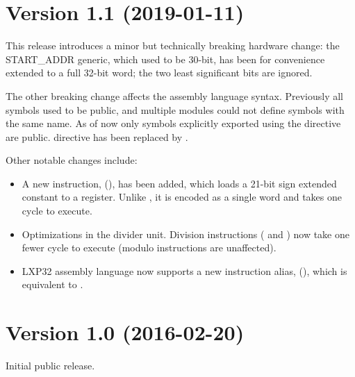\documentclass[a4paper,12pt,twoside,extrafontsizes]{memoir}
\begin{document}
\section*{Version 1.1 (2019-01-11)}

This release introduces a minor but technically breaking hardware change: the START\_ADDR generic, which used to be 30-bit, has been for convenience extended to a full 32-bit word; the two least significant bits are ignored.

The other breaking change affects the assembly language syntax. Previously all symbols used to be public, and multiple modules could not define symbols with the same name. As of now only symbols explicitly exported using the  directive are public.  directive has been replaced by .

Other notable changes include:

\begin{itemize}
	\item A new instruction,  (), has been added, which loads a 21-bit sign extended constant to a register. Unlike , it is encoded as a single word and takes one cycle to execute.
	\item Optimizations in the divider unit. Division instructions ( and ) now take one fewer cycle to execute (modulo instructions are unaffected).
	\item LXP32 assembly language now supports a new instruction alias,  (), which is equivalent to .
\end{itemize}

\section*{Version 1.0 (2016-02-20)}

Initial public release.
\end{document}
